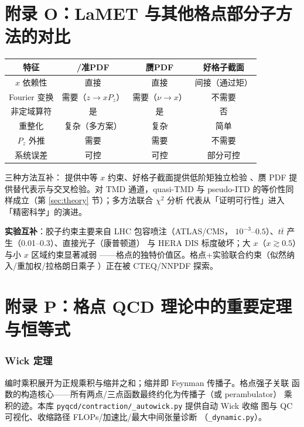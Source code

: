 \documentclass[11pt,a4paper]{ctexart}
\newcommand{\LaMET}{\text{LaMET}}
\newcommand{\code}[1]{\texttt{#1}}
\begin{document}
\section{附录 O：LaMET 与其他格点部分子方法的对比}

\begin{center}
\begin{tabular}{c c c c}
\toprule
\textbf{特征} & \textbf{\LaMET/准PDF} & \textbf{赝PDF} &
\textbf{好格子截面} \\
\midrule
$x$ 依赖性 & 直接 & 直接 & 间接（通过矩） \\
Fourier 变换 & 需要（$z\to xP_z$） & 需要（$\nu\to x$） & 不需要 \\
非定域算符 & 是 & 是 & 否 \\
重整化 & 复杂（多方案） & 复杂 & 简单 \\
$P_z$ 外推 & 需要 & 需要 & 不需要 \\
系统误差 & 可控 & 可控 & 部分可控 \\
\bottomrule
\end{tabular}
\end{center}
三种方法互补：\LaMET{} 提供中等 $x$ 约束、好格子截面提供低阶矩独立检验
、赝 PDF 提供替代表示与交叉检验。对 TMD 通道，quasi-TMD 与 pseudo-ITD
的等价性同样成立（第 \ref{sec:theory} 节）；多方法联合 $\chi^2$ 分析
代表从「证明可行性」进入「精密科学」的演进。

\textbf{实验互补}：胶子约束主要来自 LHC 包容喷注（ATLAS/CMS，
$10^{-3}$--$0.5$）、$t\bar t$ 产生（0.01--0.3）、直接光子（康普顿道）
与 HERA DIS 标度破坏；大 $x$（$x\gtrsim0.5$）与小 $x$ 区域约束显著减弱
——格点的独特价值区。格点+实验联合约束（似然纳入/重加权/拉格朗日乘子
）正在被 CTEQ/NNPDF 探索。

\section{附录 P：格点 QCD 理论中的重要定理与恒等式}

\subsubsection{Wick 定理}

编时乘积展开为正规乘积与缩并之和；缩并即 Feynman 传播子。格点强子关联
函数的构造核心——所有两点/三点函数最终约化为传播子（或 perambulator）
乘积的迹。本库 \code{pyqcd/contraction/\_autowick.py} 提供自动 Wick 收缩
图与 QC 可视化、收缩路径 FLOPs/加速比/最大中间张量诊断
（\code{\_dynamic.py}）。
\end{document}
